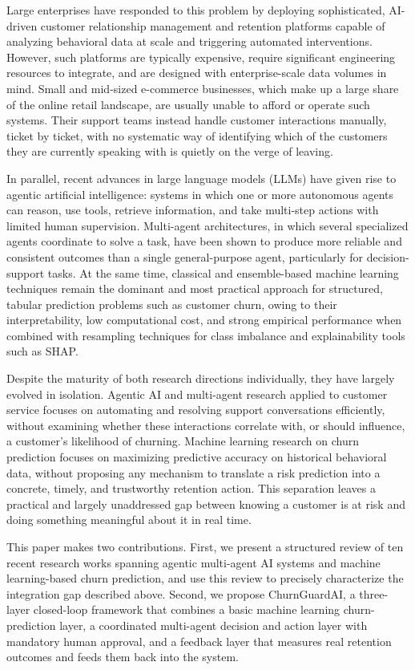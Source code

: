 \documentclass[conference]{IEEEtran}
\begin{document}
Large enterprises have responded to this problem by deploying sophisticated, AI-driven customer relationship management and retention platforms capable of analyzing behavioral data at scale and triggering automated interventions. However, such platforms are typically expensive, require significant engineering resources to integrate, and are designed with enterprise-scale data volumes in mind. Small and mid-sized e-commerce businesses, which make up a large share of the online retail landscape, are usually unable to afford or operate such systems. Their support teams instead handle customer interactions manually, ticket by ticket, with no systematic way of identifying which of the customers they are currently speaking with is quietly on the verge of leaving.

In parallel, recent advances in large language models (LLMs) have given rise to agentic artificial intelligence: systems in which one or more autonomous agents can reason, use tools, retrieve information, and take multi-step actions with limited human supervision. Multi-agent architectures, in which several specialized agents coordinate to solve a task, have been shown to produce more reliable and consistent outcomes than a single general-purpose agent, particularly for decision-support tasks. At the same time, classical and ensemble-based machine learning techniques remain the dominant and most practical approach for structured, tabular prediction problems such as customer churn, owing to their interpretability, low computational cost, and strong empirical performance when combined with resampling techniques for class imbalance and explainability tools such as SHAP.

Despite the maturity of both research directions individually, they have largely evolved in isolation. Agentic AI and multi-agent research applied to customer service focuses on automating and resolving support conversations efficiently, without examining whether these interactions correlate with, or should influence, a customer's likelihood of churning. Machine learning research on churn prediction focuses on maximizing predictive accuracy on historical behavioral data, without proposing any mechanism to translate a risk prediction into a concrete, timely, and trustworthy retention action. This separation leaves a practical and largely unaddressed gap between knowing a customer is at risk and doing something meaningful about it in real time.

This paper makes two contributions. First, we present a structured review of ten recent research works spanning agentic multi-agent AI systems and machine learning-based churn prediction, and use this review to precisely characterize the integration gap described above. Second, we propose ChurnGuardAI, a three-layer closed-loop framework that combines a basic machine learning churn-prediction layer, a coordinated multi-agent decision and action layer with mandatory human approval, and a feedback layer that measures real retention outcomes and feeds them back into the system.
\end{document}

